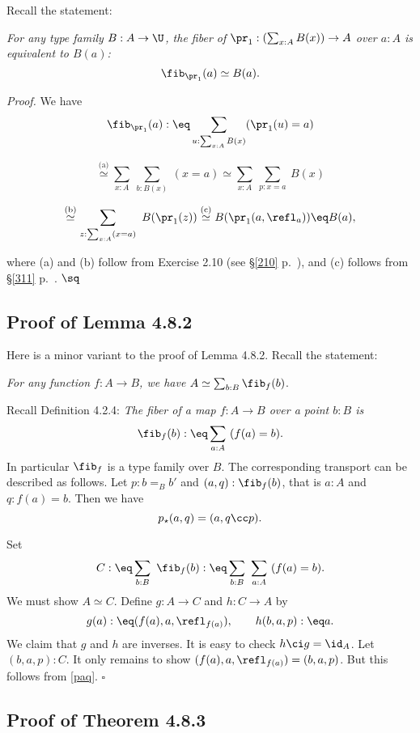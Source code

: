 \documentclass[12pt]{article}
\begin{document}
Recall the statement:

\emph{For any type family $B:A\to\U$, the fiber of $\pr_1:(\sum_{x:A}B(x))\to A$ over $a:A$ is equivalent to $B(a)$:}
$$
\fib_{\pr_1}(a)\simeq B(a).
$$

\nn\emph{Proof.} We have
$$\fib_{\pr_1}(a):\eq\sum_{u:\sum_{x:A}B(x)}(\pr_1(u)=a)$$

$$\overset{\text{(a)}}\simeq\sum_{x:A}\ \sum_{b:B(x)}\ (x=a)\simeq\sum_{x:A}\ \sum_{p:x=a}\ B(x)$$

$$\overset{\text{(b)}}\simeq\sum_{z:\sum_{x:A}(x=a)}\ B(\pr_1(z))\overset{\text{(c)}}\simeq B(\pr_1(a,\refl_a))\eq B(a),$$ 

\nn where (a) and (b) follow from Exercise 2.10 (see \S\ref{210} p.~\pageref{210}), and (c) follows from \S\ref{311} p.~\pageref{311}. $\sq$


\subsection{Proof of Lemma 4.8.2}\label{482}

Here is a minor variant to the proof of Lemma 4.8.2. Recall the statement:

\emph{For any function $f:A\to B$, we have} $A\simeq\sum_{b:B}\fib_f(b)$.

Recall Definition 4.2.4: \emph{The fiber of a map $f:A\to B$ over a point $b:B$ is} 
$$
\fib_f(b):\eq\sum_{a:A}\ (f(a)=b).
$$ 
In particular $\fib_f$ is a type family over $B$. The corresponding transport can be described as follows. Let $p:b=_Bb'$ and $(a,q):\fib_f(b)$, that is $a:A$ and $q:f(a)=b$. Then we have 
\begin{equation}\label{paq}
p_\star(a,q)=(a,q\cc p).
\end{equation}

Set 
$$
C:\eq\sum_{b:B}\ \fib_f(b):\eq\sum_{b:B}\ \sum_{a:A}\ (f(a)=b).
$$ 
We must show $A\simeq C$. Define $g:A\to C$ and $h:C\to A$ by 
$$
g(a):\eq(f(a),a,\refl_{f(a)}),\qquad h(b,a,p):\eq a.
$$ 
We claim that $g$ and $h$ are inverses. It is easy to check $h\ci g=\id_A$. Let $(b,a,p):C$. It only remains to show $(f(a),a,\refl_{f(a)})=(b,a,p)$. But this follows from \eqref{paq}. $\square$


\subsection{Proof of Theorem 4.8.3}
\end{document}
